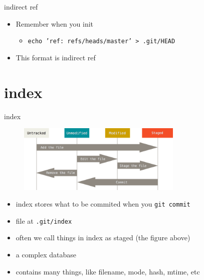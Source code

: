 \documentclass[aspectratio=169]{beamer}
\newcommand{\T}[1]{\texttt{#1}}
\begin{document}
\begin{frame}{indirect ref}
  \begin{itemize}
    \item Remember when you init\begin{itemize}
      \item \T{echo 'ref: refs/heads/master' > .git/HEAD}
    \end{itemize}
    \item This format is indirect ref
  \end{itemize}
\end{frame}

\section{index}
\begin{frame}{index}
  \begin{figure}
    \centering
    \includegraphics[width=0.7\textwidth]{img/lifecycle.png}
  \end{figure}
  \begin{itemize}
    \item index stores what to be commited when you \T{git commit}
    \item file at \T{.git/index}
    \item often we call things in index as staged (the figure above)
    \item a complex database
    \item contains many things, like filename, mode, hash, mtime, etc
  \end{itemize}
\end{frame}
\end{document}
